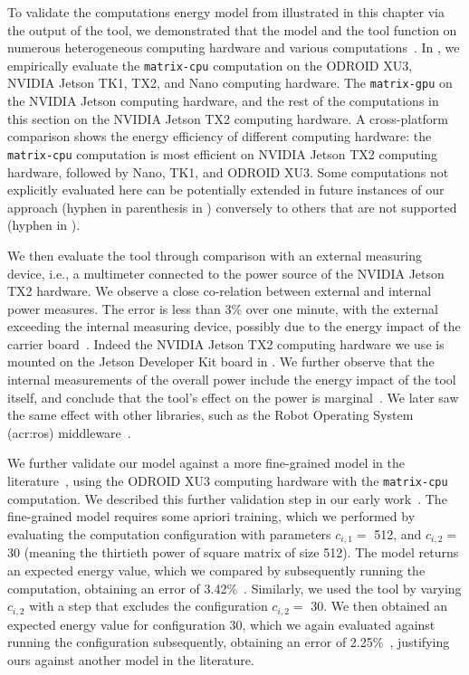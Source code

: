 To validate the computations energy model from  illustrated in this chapter via the output of the \powprof{} tool, we demonstrated that the model and the tool function on numerous heterogeneous computing hardware and various computations~\citep{seewald2019coarse}. In , we empirically evaluate the {\small\tt matrix-cpu} computation on the ODROID XU3, NVIDIA Jetson TK1, TX2, and Nano computing hardware. The {\small\tt matrix-gpu} on the NVIDIA Jetson computing hardware, and the rest of the computations in this section on the NVIDIA Jetson TX2 computing hardware. A cross-platform comparison shows the energy efficiency of different computing hardware: the {\small\tt matrix-cpu} computation is most efficient on NVIDIA Jetson TX2 computing hardware, followed by Nano, TK1, and ODROID XU3. Some computations not explicitly evaluated here can be potentially extended in future instances of our approach (hyphen in parenthesis in ) conversely to others that are not supported (hyphen in ). 

We then evaluate the \powprof{} tool through comparison with an external measuring device, i.e., a multimeter connected to the power source of the NVIDIA Jetson TX2 hardware. We observe a close co-relation between external and internal power measures. The error is less than 3\% over one minute, with the external exceeding the internal measuring device, possibly due to the energy impact of the carrier board~\citep{seewald2019coarse}. Indeed the NVIDIA Jetson TX2 computing hardware we use is mounted on the Jetson Developer Kit board in . We further observe that the internal measurements of the overall power include the energy impact of the tool itself, and conclude that the tool's effect on the power is marginal~\citep{seewald2019coarse}. We later saw the same effect with other libraries, such as the Robot Operating System (\Gls{acr:ros}) middleware~\citep{zamanakos2020energy}.

We further validate our model against a more fine-grained model in the literature~\citep{nunez2013enabling,nikov2015evaluation}, using the ODROID XU3 computing hardware with the {\small\tt matrix-cpu} computation. We described this further validation step in our early work~\citep{seewald2019coarse}. The fine-grained model requires some apriori training, which we performed by evaluating the computation configuration with parameters $c_{i,1}=$ 512, and $c_{i,2}=$ 30 (meaning the thirtieth power of square matrix of size 512). The model returns an expected energy value, which we compared by subsequently running the computation, obtaining an error of 3.42\%~\citep{seewald2019coarse}. Similarly, we used the \powprof{} tool by varying $c_{i,2}$ with a step that excludes the configuration $c_{i,2}=$ 30. We then obtained an expected energy value for configuration 30, which we again evaluated against running the configuration subsequently, obtaining an error of 2.25\%~\citep{seewald2019coarse}, justifying ours against another model in the literature. 


